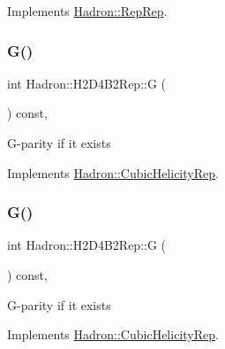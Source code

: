 Implements \mbox{\hyperlink{structHadron_1_1RepRep_a92c8802e5ed7afd7da43ccfd5b7cd92b}{Hadron\+::\+Rep\+Rep}}.

\mbox{\label{structHadron_1_1H2D4B2Rep_a836bcf373e02587cc325b7b43dfd871f}} 
\subsubsection{\texorpdfstring{G()}{G()}\hspace{0.1cm}{\footnotesize\ttfamily [1/3]}}
{\footnotesize\ttfamily int Hadron\+::\+H2\+D4\+B2\+Rep\+::G (\begin{DoxyParamCaption}{ }\end{DoxyParamCaption}) const\hspace{0.3cm}{\ttfamily [inline]}, {\ttfamily [virtual]}}

G-\/parity if it exists 

Implements \mbox{\hyperlink{structHadron_1_1CubicHelicityRep_a50689f42be1e6170aa8cf6ad0597018b}{Hadron\+::\+Cubic\+Helicity\+Rep}}.

\mbox{\label{structHadron_1_1H2D4B2Rep_a836bcf373e02587cc325b7b43dfd871f}} 
\subsubsection{\texorpdfstring{G()}{G()}\hspace{0.1cm}{\footnotesize\ttfamily [2/3]}}
{\footnotesize\ttfamily int Hadron\+::\+H2\+D4\+B2\+Rep\+::G (\begin{DoxyParamCaption}{ }\end{DoxyParamCaption}) const\hspace{0.3cm}{\ttfamily [inline]}, {\ttfamily [virtual]}}

G-\/parity if it exists 

Implements \mbox{\hyperlink{structHadron_1_1CubicHelicityRep_a50689f42be1e6170aa8cf6ad0597018b}{Hadron\+::\+Cubic\+Helicity\+Rep}}.

\mbox{\label{structHadron_1_1H2D4B2Rep_a836bcf373e02587cc325b7b43dfd871f}} 
